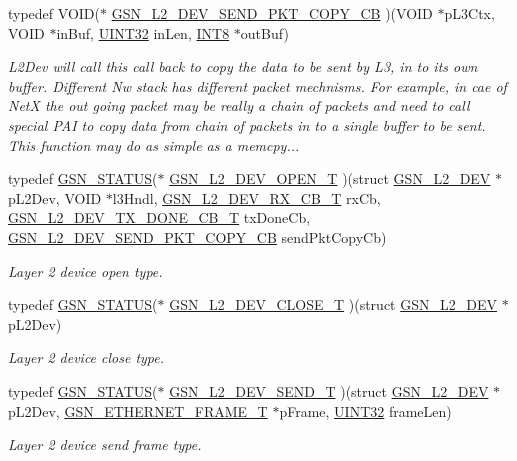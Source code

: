\begin{DoxyCompactItemize}
typedef VOID($\ast$ \hyperlink{a00670_ga6c639d0fa9b75482d68bfa97834a0ca9}{GSN\_\-L2\_\-DEV\_\-SEND\_\-PKT\_\-COPY\_\-CB} )(VOID $\ast$pL3Ctx, VOID $\ast$inBuf, \hyperlink{a00660_gae1e6edbbc26d6fbc71a90190d0266018}{UINT32} inLen, \hyperlink{a00660_ga307b8734c020247f6bac4fcde0dcfbb9}{INT8} $\ast$outBuf)
\begin{DoxyCompactList}\small\item\em L2Dev will call this call back to copy the data to be sent by L3, in to its own buffer. Different Nw stack has different packet mechnisms. For example, in cae of NetX the out going packet may be really a chain of packets and need to call special PAI to copy data from chain of packets in to a single buffer to be sent. This function may do as simple as a memcpy... \end{DoxyCompactList}\item 
typedef \hyperlink{a00660_gada5951904ac6110b1fa95e51a9ddc217}{GSN\_\-STATUS}($\ast$ \hyperlink{a00670_gaea3ffbbb6ea57c5335f9011b4dcfe651}{GSN\_\-L2\_\-DEV\_\-OPEN\_\-T} )(struct \hyperlink{a00107}{GSN\_\-L2\_\-DEV} $\ast$pL2Dev, VOID $\ast$l3Hndl, \hyperlink{a00670_ga528d617c85be4b1aed82ce677f941587}{GSN\_\-L2\_\-DEV\_\-RX\_\-CB\_\-T} rxCb, \hyperlink{a00670_ga4d5db18667f665fc99ec6171cf27b5be}{GSN\_\-L2\_\-DEV\_\-TX\_\-DONE\_\-CB\_\-T} txDoneCb, \hyperlink{a00670_ga6c639d0fa9b75482d68bfa97834a0ca9}{GSN\_\-L2\_\-DEV\_\-SEND\_\-PKT\_\-COPY\_\-CB} sendPktCopyCb)
\begin{DoxyCompactList}\small\item\em Layer 2 device open type. \end{DoxyCompactList}\item 
typedef \hyperlink{a00660_gada5951904ac6110b1fa95e51a9ddc217}{GSN\_\-STATUS}($\ast$ \hyperlink{a00670_ga76681abc89c36ea37c57cedb070f1ec2}{GSN\_\-L2\_\-DEV\_\-CLOSE\_\-T} )(struct \hyperlink{a00107}{GSN\_\-L2\_\-DEV} $\ast$pL2Dev)
\begin{DoxyCompactList}\small\item\em Layer 2 device close type. \end{DoxyCompactList}\item 
typedef \hyperlink{a00660_gada5951904ac6110b1fa95e51a9ddc217}{GSN\_\-STATUS}($\ast$ \hyperlink{a00670_gab40e032c5bca66cf4f59d6c8cfa82e0a}{GSN\_\-L2\_\-DEV\_\-SEND\_\-T} )(struct \hyperlink{a00107}{GSN\_\-L2\_\-DEV} $\ast$pL2Dev, \hyperlink{a00068}{GSN\_\-ETHERNET\_\-FRAME\_\-T} $\ast$pFrame, \hyperlink{a00660_gae1e6edbbc26d6fbc71a90190d0266018}{UINT32} frameLen)
\begin{DoxyCompactList}\small\item\em Layer 2 device send frame type. \end{DoxyCompactList}\item 

\end{DoxyCompactItemize}

